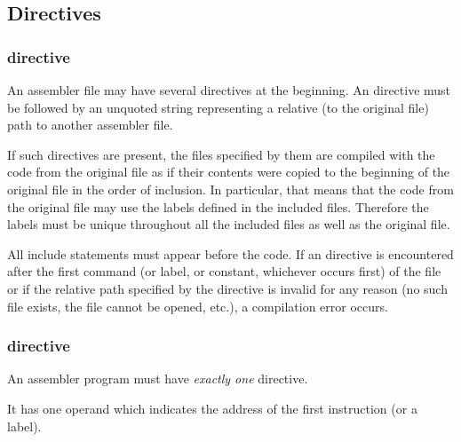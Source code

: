 \subsection{Directives}
\subsubsection{ directive}

\vspace{-0.2cm}

An assembler file may have several  directives at the beginning.
An  directive must be followed by an unquoted string
representing a relative (to the original file) path to another assembler file.

If such directives are present, the files specified by them are compiled with
the code from the original file as if their contents were copied to
the beginning of the original file in the order of inclusion.
In particular, that means that the code from the original file may use
the labels defined in the included files.
Therefore the labels must be unique throughout all the included files
as well as the original file.

All include statements must appear before the code.
If an  directive is encountered after the first command
(or label, or constant, whichever occurs first) of the file or if the
relative path specified by the directive is invalid for any reason
(no such file exists, the file cannot be opened, etc.),
a compilation error occurs.

\vspace{-0.35cm}

\hypertarget{directives:end}{
	\subsubsection{ directive}
}

\vspace{-0.2cm}

An assembler program must have \textit{exactly one}  directive.

It has one operand which indicates the address of the first instruction
(or a label).
